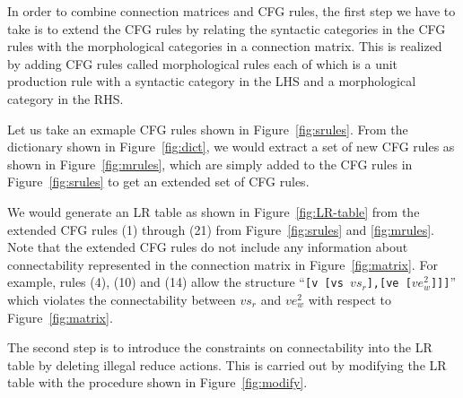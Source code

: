 In order to combine connection matrices and CFG rules, the first step
we have to take is to extend the CFG rules by relating the syntactic
categories in the CFG rules with the morphological categories in a
connection matrix. This is realized by adding CFG rules called
morphological rules each of which is a unit production rule with a
syntactic category in the LHS and a morphological category in the RHS.

\begin{center}
  \def\arraystretch{}
  
\end{center}

\begin{center}
  \def\arraystretch{}
  
\end{center}

Let us take an exmaple CFG rules shown in Figure~\ref{fig:srules}.
From the dictionary shown in Figure~\ref{fig:dict}, we would extract a
set of new CFG rules as shown in Figure~\ref{fig:mrules}, which are
simply added to the CFG rules in Figure~\ref{fig:srules} to get an
extended set of CFG rules.

We would generate an LR table as shown in Figure~\ref{fig:LR-table} from
the extended CFG rules (1) through (21) from Figure~\ref{fig:srules}
and \ref{fig:mrules}.  Note that the extended CFG rules do not include
any information about connectability represented in the connection
matrix in Figure~\ref{fig:matrix}. For example, rules (4), (10) and
(14) allow the structure ``{\tt [v [vs $vs_r$],[ve [$ve_w^2$]]]}''
which violates the connectability between $vs_r$ and $ve_w^2$ with
respect to Figure~\ref{fig:matrix}.

\begin{center}
  \def\arraystretch{}
  
\end{center}

The second step is to introduce the constraints on connectability into
the LR table by deleting illegal reduce actions. This is carried out
by modifying the LR table with the procedure shown in
Figure~\ref{fig:modify}.

\begin{center}
    
\end{center}

